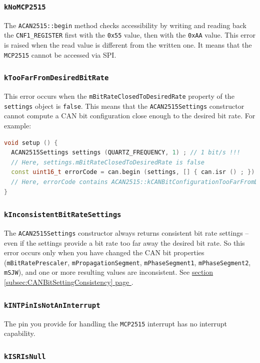 \documentclass[9pt, a4paper, obeyspaces]{extarticle}
\newcommand\refSubsectionPage[1]{\hyperref[subsec:#1]{section \ref*{subsec:#1} page \pageref{subsec:#1}}}
\newcommand \subsubsectionLabel[2]{\subsubsection{#1}\label{subsubsec:#2}}
\begin{document}
\subsubsectionLabel{\texttt{kNoMCP2515}}{kNoMCP2515}

The \texttt{ACAN2515::begin} method checks accessibility by writing and reading back the \texttt{CNF1\_REGISTER} first with the \texttt{0x55} value, then with the \texttt{0xAA} value. This error is raised when the read value is different from the written one. It means that the \texttt{MCP2515} cannot be accessed via SPI. 

\subsubsectionLabel{\texttt{kTooFarFromDesiredBitRate}}{kTooFarFromDesiredBitRate}

This error occurs when the \texttt{mBitRateClosedToDesiredRate} property of the \texttt{settings} object is \texttt{false}. This means that the \texttt{ACAN2515Settings} constructor cannot compute a CAN bit configuration close enough to the desired bit rate. For example:

{ \small\begin{lstlisting}[language=c++]
void setup () {
  ACAN2515Settings settings (QUARTZ_FREQUENCY, 1) ; // 1 bit/s !!!
  // Here, settings.mBitRateClosedToDesiredRate is false
  const uint16_t errorCode = can.begin (settings, [] { can.isr () ; }) ;
  // Here, errorCode contains ACAN2515::kCANBitConfigurationTooFarFromDesiredBitRate
}
\end{lstlisting}}




\subsubsectionLabel{\texttt{kInconsistentBitRateSettings}}{kInconsistentBitRateSettings}

The \texttt{ACAN2515Settings} constructor always returns consistent bit rate settings -- even if the settings provide a bit rate too far away the desired bit rate. So this error occurs only when you have changed the CAN bit properties (\texttt{mBitRatePrescaler}, \texttt{mPropagationSegment}, \texttt{mPhaseSegment1}, \texttt{mPhaseSegment2}, \texttt{mSJW}), and one or more resulting values are inconsistent. See \refSubsectionPage{CANBitSettingConsistency}.











\subsubsectionLabel{\texttt{kINTPinIsNotAnInterrupt}}{kINTPinIsNotAnInterrupt}

The pin you provide for handling the \texttt{MCP2515} interrupt has no interrupt capability.

\subsubsectionLabel{\texttt{kISRIsNull}}{kISRIsNull}
\end{document}

